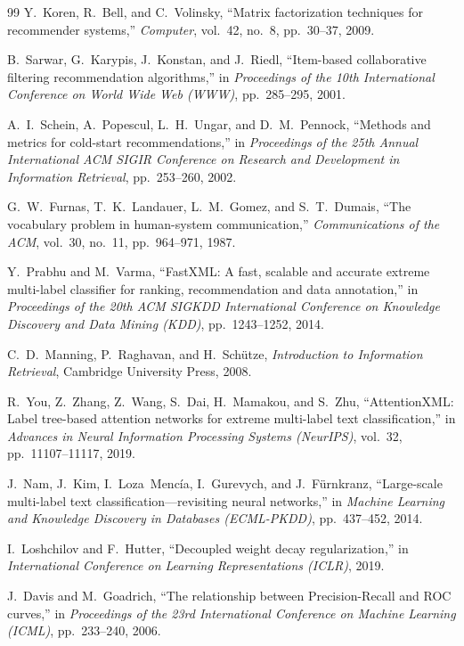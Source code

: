 \documentclass[11pt]{article}
\begin{document}
\begin{thebibliography}{99}
Y.~Koren, R.~Bell, and C.~Volinsky,
``Matrix factorization techniques for recommender systems,''
\emph{Computer}, vol.~42, no.~8, pp.~30--37, 2009.

B.~Sarwar, G.~Karypis, J.~Konstan, and J.~Riedl,
``Item-based collaborative filtering recommendation algorithms,''
in \emph{Proceedings of the 10th International Conference on World Wide Web (WWW)}, pp.~285--295, 2001.

A.~I.~Schein, A.~Popescul, L.~H.~Ungar, and D.~M.~Pennock,
``Methods and metrics for cold-start recommendations,''
in \emph{Proceedings of the 25th Annual International ACM SIGIR Conference on Research and Development in Information Retrieval}, pp.~253--260, 2002.

G.~W.~Furnas, T.~K.~Landauer, L.~M.~Gomez, and S.~T.~Dumais,
``The vocabulary problem in human-system communication,''
\emph{Communications of the ACM}, vol.~30, no.~11, pp.~964--971, 1987.

Y.~Prabhu and M.~Varma,
``FastXML: A fast, scalable and accurate extreme multi-label classifier for ranking, recommendation and data annotation,''
in \emph{Proceedings of the 20th ACM SIGKDD International Conference on Knowledge Discovery and Data Mining (KDD)}, pp.~1243--1252, 2014.

C.~D.~Manning, P.~Raghavan, and H.~Sch\"{u}tze,
\emph{Introduction to Information Retrieval},
Cambridge University Press, 2008.

R.~You, Z.~Zhang, Z.~Wang, S.~Dai, H.~Mamakou, and S.~Zhu,
``AttentionXML: Label tree-based attention networks for extreme multi-label text classification,''
in \emph{Advances in Neural Information Processing Systems (NeurIPS)}, vol.~32, pp.~11107--11117, 2019.

J.~Nam, J.~Kim, I.~Loza~Menc\'{i}a, I.~Gurevych, and J.~F\"{u}rnkranz,
``Large-scale multi-label text classification---revisiting neural networks,''
in \emph{Machine Learning and Knowledge Discovery in Databases (ECML-PKDD)}, pp.~437--452, 2014.

I.~Loshchilov and F.~Hutter,
``Decoupled weight decay regularization,''
in \emph{International Conference on Learning Representations (ICLR)}, 2019.

J.~Davis and M.~Goadrich,
``The relationship between Precision-Recall and ROC curves,''
in \emph{Proceedings of the 23rd International Conference on Machine Learning (ICML)}, pp.~233--240, 2006.


\end{thebibliography}
\end{document}
